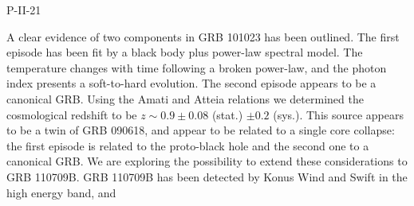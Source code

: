 P-II-21


\bigskip



\bigskip

\noindent A clear evidence of two components in GRB 101023 has been outlined. The first episode has been fit by a black body plus power-law spectral model. The temperature changes with time following a broken power-law, and the photon index presents a soft-to-hard evolution. The second episode appears to be a canonical GRB. Using the Amati and Atteia relations we determined the cosmological redshift to be $z \sim 0.9 \pm 0.08$ (stat.) $\pm 0.2$ (sys.). This source appears to be a twin of GRB 090618, and appear to be related to a single core collapse: the first episode is related to the proto-black hole and the second one to a canonical GRB. We are exploring the possibility to extend these considerations to GRB 110709B. GRB 110709B has been detected by Konus Wind and Swift in the high energy band, and

